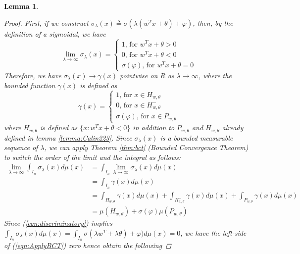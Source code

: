 \documentclass[12pt]{amsart}
\theoremstyle{plain}
\newtheorem{lemma}[thm]{Lemma}
\theoremstyle{definition}
\theoremstyle{remark}
\numberwithin{equation}{section}
\numberwithin{thm}{section}
\begin{document}
\begin{lemma}
\begin{proof}
First, if we construct $\sigma_\lambda (x) \triangleq \sigma(\lambda (w^Tx+\theta) + \varphi)$, then, by the definition of a sigmoidal, we have
    \begin{equation*}
        \lim_{\lambda \to \infty} \sigma_{\lambda}(x) = \begin{cases}
            1 \text{, for } w^Tx+\theta > 0 \\
            0 \text{, for } w^Tx+\theta <0 \\
            \sigma(\varphi) \text{, for } w^Tx+\theta = 0  
        \end{cases}
    \end{equation*}
Therefore, we have $\sigma_{\lambda}(x) \to \gamma(x)$ pointwise on $R$ as $\lambda \to \infty$, where the bounded function $\gamma(x)$ is defined as
    \begin{equation*}
        \gamma(x) = \begin{cases}
            1 \text{, for } x \in H_{w,\theta} \\
            0 \text{, for } x \in H^{-}_{w,\theta} \\
            \sigma(\varphi) \text{, for } x \in P_{w,\theta}  
        \end{cases}
    \end{equation*}
    where $H^{-}_{w,\theta}$ is defined as $\{ x : w^Tx+\theta < 0 \}$ in addition to $P_{w,\theta}$ and $H_{w,\theta}$ already defined in lemma \ref{lemma:Calin223}. Since $\sigma_{\lambda}(x)$ is a bounded measurable sequence of $\lambda$, we can apply Theorem \ref{thm:bct} (Bounded Convergence Theorem) to switch the order of the limit and the integral as follows:
    \begin{equation}\label{eqn:ApplyBCT}
        \begin{aligned}
            \lim_{\lambda \to \infty} \int_{I_n} \sigma_{\lambda}(x) d\mu(x) &= \int_{I_n} \lim_{\lambda \to \infty }  \sigma_{\lambda}(x) d\mu(x) \\
            &= \int_{I_n} \gamma(x)d\mu(x)\\
            & = \int_{H_{w,\theta}}\gamma(x)d\mu(x) + \int_{H^{-}_{w,\theta}}\gamma(x)d\mu(x) + \int_{P_{w,\theta}}\gamma(x)d\mu(x) \\
            & = \mu(H_{w,\theta}) + \sigma(\varphi)\mu(P_{w,\theta})
        \end{aligned}
    \end{equation}
Since (\ref{eqn:discriminatory}) implies $\int_{I_n} \sigma_{\lambda}(x)d\mu(x) = \int_{I_n} \sigma(\lambda w^T+\lambda \theta) + \varphi)d\mu(x) =0$, we have the left-side of (\ref{eqn:ApplyBCT}) zero hence obtain the following

\end{proof}
\end{lemma}
\end{document}
